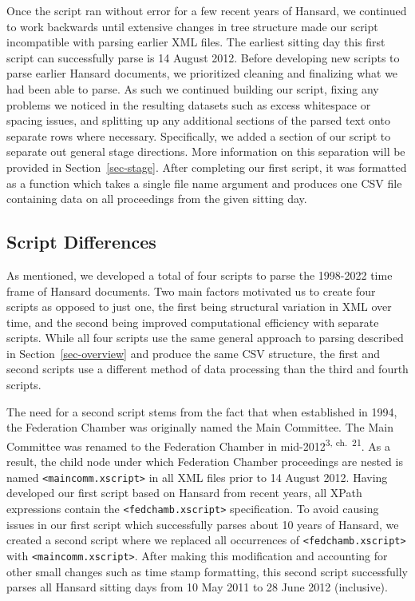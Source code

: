 \documentclass[
  letterpaper,
  DIV=11,
  numbers=noendperiod]{scrartcl}
\begin{document}
Once the script ran without error for a few recent years of Hansard, we
continued to work backwards until extensive changes in tree structure
made our script incompatible with parsing earlier XML files. The
earliest sitting day this first script can successfully parse is 14
August 2012. Before developing new scripts to parse earlier Hansard
documents, we prioritized cleaning and finalizing what we had been able
to parse. As such we continued building our script, fixing any problems
we noticed in the resulting datasets such as excess whitespace or
spacing issues, and splitting up any additional sections of the parsed
text onto separate rows where necessary. Specifically, we added a
section of our script to separate out general stage directions. More
information on this separation will be provided in
Section~\ref{sec-stage}. After completing our first script, it was
formatted as a function which takes a single file name argument and
produces one CSV file containing data on all proceedings from the given
sitting day.

\hypertarget{sec-diff}{%
\subsection{Script Differences}\label{sec-diff}}

As mentioned, we developed a total of four scripts to parse the
1998-2022 time frame of Hansard documents. Two main factors motivated us
to create four scripts as opposed to just one, the first being
structural variation in XML over time, and the second being improved
computational efficiency with separate scripts. While all four scripts
use the same general approach to parsing described in
Section~\ref{sec-overview} and produce the same CSV structure, the first
and second scripts use a different method of data processing than the
third and fourth scripts.

The need for a second script stems from the fact that when established
in 1994, the Federation Chamber was originally named the Main Committee.
The Main Committee was renamed to the Federation Chamber in
mid-2012\textsuperscript{3, ch.~21}. As a result, the child node under
which Federation Chamber proceedings are nested is named
\texttt{\textless{}maincomm.xscript\textgreater{}} in all XML files
prior to 14 August 2012. Having developed our first script based on
Hansard from recent years, all XPath expressions contain the
\texttt{\textless{}fedchamb.xscript\textgreater{}} specification. To
avoid causing issues in our first script which successfully parses about
10 years of Hansard, we created a second script where we replaced all
occurrences of \texttt{\textless{}fedchamb.xscript\textgreater{}} with
\texttt{\textless{}maincomm.xscript\textgreater{}}. After making this
modification and accounting for other small changes such as time stamp
formatting, this second script successfully parses all Hansard sitting
days from 10 May 2011 to 28 June 2012 (inclusive).
\end{document}
